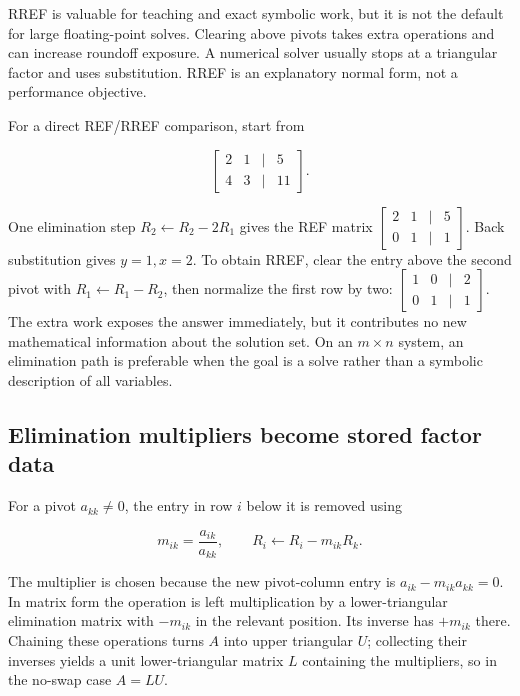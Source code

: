 RREF is valuable for teaching and exact symbolic work, but it is not the default for large floating-point solves. Clearing above pivots takes extra operations and can increase roundoff exposure. A numerical solver usually stops at a triangular factor and uses substitution. RREF is an explanatory normal form, not a performance objective.

For a direct REF/RREF comparison, start from

\[
\begin{bmatrix}2&1&|&5\\4&3&|&11\end{bmatrix}.
\]

One elimination step \(R_2\leftarrow R_2-2R_1\) gives the REF matrix \(\begin{bmatrix}2&1&|&5\\0&1&|&1\end{bmatrix}\). Back substitution gives \(y=1,x=2\). To obtain RREF, clear the entry above the second pivot with \(R_1\leftarrow R_1-R_2\), then normalize the first row by two: \(\begin{bmatrix}1&0&|&2\\0&1&|&1\end{bmatrix}\). The extra work exposes the answer immediately, but it contributes no new mathematical information about the solution set. On an \(m\times n\) system, an elimination path is preferable when the goal is a solve rather than a symbolic description of all variables.

\subsection{Elimination multipliers become stored factor data}\label{elimination-multipliers-become-stored-factor-data}

For a pivot \(a_{kk}\ne0\), the entry in row \(i\) below it is removed using

\[
m_{ik}=\frac{a_{ik}}{a_{kk}},\qquad R_i\leftarrow R_i-m_{ik}R_k.
\]

The multiplier is chosen because the new pivot-column entry is \(a_{ik}-m_{ik}a_{kk}=0\). In matrix form the operation is left multiplication by a lower-triangular elimination matrix with \(-m_{ik}\) in the relevant position. Its inverse has \(+m_{ik}\) there. Chaining these operations turns \(A\) into upper triangular \(U\); collecting their inverses yields a unit lower-triangular matrix \(L\) containing the multipliers, so in the no-swap case \(A=LU\).

